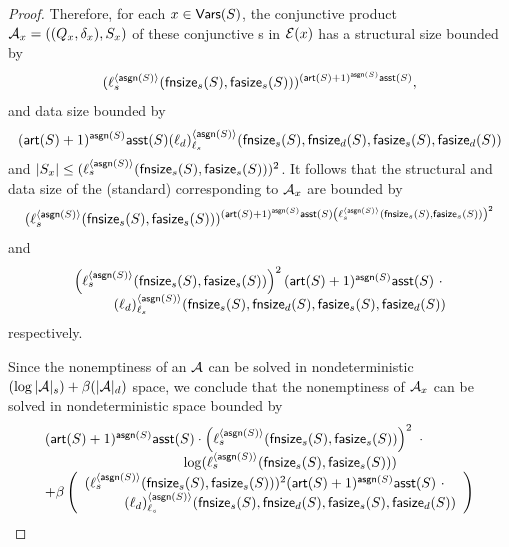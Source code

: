 \begin{proof}
Therefore, for each $x \in \mathsf{Vars}(S)$, the conjunctive product \SA{} $\mathcal{A}_x=((Q_x, \delta_x), S_x)$ of these conjunctive \SA{}s  in $\mathcal{E}(x)$ has a structural size bounded by 
%
$$(\ell^{\langle \mathsf{asgn}(S) \rangle}_s(\mathsf{fnsize}_s(S), \mathsf{fasize}_s(S)))^{(\mathsf{art}(S)+1)^{\mathsf{asgn}(S)} \mathsf{asst}(S)},$$
%
and data size bounded by
%
\[ (\mathsf{art}(S)+1)^{\mathsf{asgn}(S)} \mathsf{asst}(S) (\ell_d)^{\langle  \mathsf{asgn}(S) \rangle}_{\ell_s}(\mathsf{fnsize}_s(S),\mathsf{fnsize}_d(S),  \mathsf{fasize}_s(S), \mathsf{fasize}_d(S)) \]
%
and $|S_x| \le (\ell_s^{\langle \mathsf{asgn}(S) \rangle}(\mathsf{fnsize}_s(S), \mathsf{fasize}_s(S)))^2$. 
It follows that the structural and data size of the (standard) \SA{} corresponding to $\mathcal{A}_x$ are  bounded by 
%
$$(\ell^{\langle \mathsf{asgn}(S) \rangle}_s(\mathsf{fnsize}_s(S), \mathsf{fasize}_s(S)))^{(\mathsf{art}(S)+1)^{\mathsf{asgn}(S)} \mathsf{asst}(S) \left(\ell_s^{\langle \mathsf{asgn}(S) \rangle}(\mathsf{fnsize}_s(S), \mathsf{fasize}_s(S))\right)^2}$$
%
and
$$
\begin{array}{l}
\left(\ell_s^{\langle \mathsf{asgn}(S) \rangle}(\mathsf{fnsize}_s(S), \mathsf{fasize}_s(S))\right)^2 (\mathsf{art}(S)+1)^{\mathsf{asgn}(S)} \mathsf{asst}(S)\ \cdot  \\
\hspace{1cm}(\ell_d)^{\langle  \mathsf{asgn}(S) \rangle}_{\ell_s}(\mathsf{fnsize}_s(S),\mathsf{fnsize}_d(S),  \mathsf{fasize}_s(S), \mathsf{fasize}_d(S))
\end{array}
$$
respectively.

Since the nonemptiness of an \SA{} $\mathcal{A}$ can be solved in nondeterministic $(\log |\mathcal{A}|_s) + \beta(|\mathcal{A}|_d)$ space, we conclude that the nonemptiness of $\mathcal{A}_x$ can be solved in nondeterministic space bounded by 
{\small
$$
\begin{array}{l}
(\rcdim(S)+1)^{\rcdep(S)} \rcasrt(S) \cdot \left(\ell_s^{\langle \rcdep(S) \rangle}(\rcphi_s(S), \rcpsi_s(S))\right)^2\ \cdot \\
\hspace{3.5cm} \log (\ell^{\langle \rcdep(S) \rangle}_s(\rcphi_s(S), \rcpsi_s(S))) \\
\hfill +\beta
\left(
\begin{array}{l}
(\ell_s^{\langle \rcdep(S) \rangle}(\rcphi_s(S), \rcpsi_s(S)))^2 (\rcdim(S)+1)^{\rcdep(S)} \rcasrt(S)\ \cdot  \\
\hspace{1cm} (\ell_d)^{\langle  \rcdep(S) \rangle}_{\ell_s}(\rcphi_s(S),\rcphi_d(S),  \rcpsi_s(S), \rcpsi_d(S))
\end{array}
\right)
\end{array}
$$
}


\end{proof}
